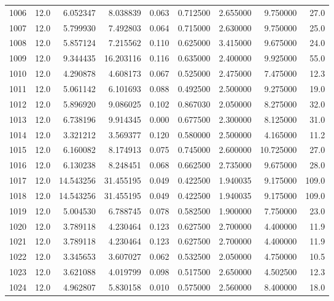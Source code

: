 \begin{tabular}{lrrrrrrrr}
1006 &   12.0 &   6.052347 &   8.038839 &  0.063 &  0.712500 &  2.655000 &   9.750000 &   27.0 \\
1007 &   12.0 &   5.799930 &   7.492803 &  0.064 &  0.715000 &  2.630000 &   9.750000 &   25.0 \\
1008 &   12.0 &   5.857124 &   7.215562 &  0.110 &  0.625000 &  3.415000 &   9.675000 &   24.0 \\
1009 &   12.0 &   9.344435 &  16.203116 &  0.116 &  0.635000 &  2.400000 &   9.925000 &   55.0 \\
1010 &   12.0 &   4.290878 &   4.608173 &  0.067 &  0.525000 &  2.475000 &   7.475000 &   12.3 \\
1011 &   12.0 &   5.061142 &   6.101693 &  0.088 &  0.492500 &  2.500000 &   9.275000 &   19.0 \\
1012 &   12.0 &   5.896920 &   9.086025 &  0.102 &  0.867030 &  2.050000 &   8.275000 &   32.0 \\
1013 &   12.0 &   6.738196 &   9.914345 &  0.000 &  0.677500 &  2.300000 &   8.125000 &   31.0 \\
1014 &   12.0 &   3.321212 &   3.569377 &  0.120 &  0.580000 &  2.500000 &   4.165000 &   11.2 \\
1015 &   12.0 &   6.160082 &   8.174913 &  0.075 &  0.745000 &  2.600000 &  10.725000 &   27.0 \\
1016 &   12.0 &   6.130238 &   8.248451 &  0.068 &  0.662500 &  2.735000 &   9.675000 &   28.0 \\
1017 &   12.0 &  14.543256 &  31.455195 &  0.049 &  0.422500 &  1.940035 &   9.175000 &  109.0 \\
1018 &   12.0 &  14.543256 &  31.455195 &  0.049 &  0.422500 &  1.940035 &   9.175000 &  109.0 \\
1019 &   12.0 &   5.004530 &   6.788745 &  0.078 &  0.582500 &  1.900000 &   7.750000 &   23.0 \\
1020 &   12.0 &   3.789118 &   4.230464 &  0.123 &  0.627500 &  2.700000 &   4.400000 &   11.9 \\
1021 &   12.0 &   3.789118 &   4.230464 &  0.123 &  0.627500 &  2.700000 &   4.400000 &   11.9 \\
1022 &   12.0 &   3.345653 &   3.607027 &  0.062 &  0.532500 &  2.050000 &   4.750000 &   10.5 \\
1023 &   12.0 &   3.621088 &   4.019799 &  0.098 &  0.517500 &  2.650000 &   4.502500 &   12.3 \\
1024 &   12.0 &   4.962807 &   5.830158 &  0.010 &  0.575000 &  2.560000 &   8.400000 &   18.0 \\

\end{tabular}
